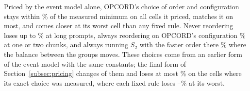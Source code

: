 Priced by the event model alone, OPCORD's choice of order and configuration stays within \ChoiceOpcordMax\% of the measured minimum on all \ChoiceCells{} cells it priced, matches it on most, and comes closer at its worst cell than any fixed rule.
Never reordering loses up to \ChoiceNeverMax\% at long prompts, always reordering on OPCORD's configuration \ChoiceAlwaysMax\% at one or two chunks, and always running $S_2$ with the faster order there \ChoiceFixedSTwoMax\% where the balance between the groups moves.
These choices come from an earlier form of the event model with the same constants; the final form of Section~\ref{subsec:pricing} changes \FinalChanged{} of them and loses at most \FinalLossMax\% on the \FinalMeasured{} cells where its exact choice was measured, where each fixed rule loses \FinalFixedLo--\FinalFixedHi\% at its worst.

